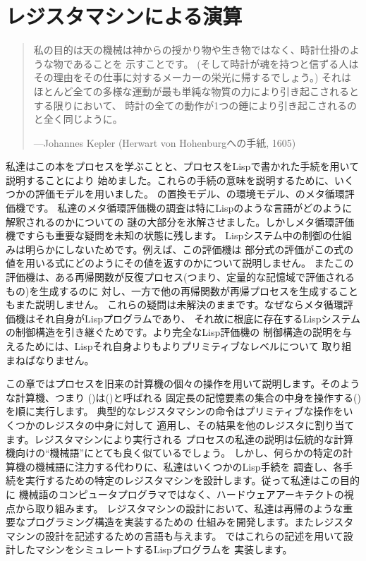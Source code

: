 \chapter{レジスタマシンによる演算}
\label{Chapter 5}

\vspace{0.2em}

\begin{quote}
私の目的は天の機械は神からの授かり物や生き物ではなく、時計仕掛のような物であることを
示すことです。
(そして時計が魂を持つと信ずる人はその理由をその仕事に対するメーカーの栄光に帰するでしょう。)
それはほとんど全ての多様な運動が最も単純な物質の力により引き起こされるとする限りにおいて、
時計の全ての動作が1つの錘により引き起こされるのと全く同じように。

---Johannes Kepler (Herwart von Hohenburgへの手紙, 1605)
\end{quote}

\vspace{1.0em}

\noindent
私達はこの本をプロセスを学ぶことと、プロセスをLispで書かれた手続を用いて説明することにより
始めました。これらの手続の意味を説明するために、いくつかの評価モデルを用いました。
の置換モデル、の環境モデル、のメタ循環評価機です。
私達のメタ循環評価機の調査は特にLispのような言語がどのように解釈されるのかについての
謎の大部分を氷解させました。しかしメタ循環評価機ですらも重要な疑問を未知の状態に残します。
Lispシステム中の制御の仕組みは明らかにしないためです。例えば、この評価機は
部分式の評価がこの式の値を用いる式にどのようにその値を返すのかについて説明しません。
またこの評価機は、ある再帰関数が反復プロセス(つまり、定量的な記憶域で評価されるもの)を生成するのに
対し、一方で他の再帰関数が再帰プロセスを生成することもまた説明しません。
これらの疑問は未解決のままです。なぜならメタ循環評価機はそれ自身がLispプログラムであり、
それ故に根底に存在するLispシステムの制御構造を引き継ぐためです。より完全なLisp評価機の
制御構造の説明を与えるためには、Lispそれ自身よりもよりプリミティブなレベルについて
取り組まねばなりません。

この章ではプロセスを旧来の計算機の個々の操作を用いて説明します。そのような計算機、つまり
()は()と呼ばれる
固定長の記憶要素の集合の中身を操作する()を順に実行します。
典型的なレジスタマシンの命令はプリミティブな操作をいくつかのレジスタの中身に対して
適用し、その結果を他のレジスタに割り当てます。レジスタマシンにより実行される
プロセスの私達の説明は伝統的な計算機向けの``機械語''にとても良く似ているでしょう。
しかし、何らかの特定の計算機の機械語に注力する代わりに、私達はいくつかのLisp手続を
調査し、各手続を実行するための特定のレジスタマシンを設計します。従って私達はこの目的に
機械語のコンピュータプログラマではなく、ハードウェアアーキテクトの視点から取り組みます。
レジスタマシンの設計において、私達は再帰のような重要なプログラミング構造を実装するための
仕組みを開発します。またレジスタマシンの設計を記述するための言語も与えます。
ではこれらの記述を用いて設計したマシンをシミュレートするLispプログラムを
実装します。

